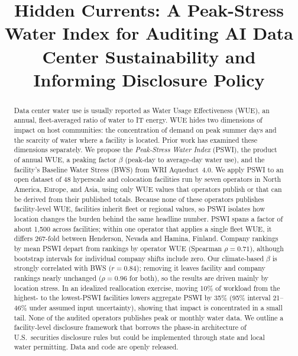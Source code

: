 \documentclass[conference,10pt]{IEEEtran}
\begin{document}
\title{Hidden Currents: A Peak-Stress Water Index for Auditing AI Data Center Sustainability and Informing Disclosure Policy}

\author{
}

\maketitle
\thispagestyle{plain}
\pagestyle{plain}

\begin{abstract}
Data center water use is usually reported as Water Usage Effectiveness (WUE),
an annual, fleet-averaged ratio of water to IT energy. WUE hides two
dimensions of impact on host communities: the concentration of demand on peak
summer days and the scarcity of water where a facility is located. Prior work
has examined these dimensions separately. We propose the \emph{Peak-Stress
Water Index} (PSWI), the product of annual WUE, a peaking factor $\beta$
(peak-day to average-day water use), and the facility's Baseline Water Stress
(BWS) from WRI Aqueduct~4.0. We apply PSWI to an open dataset of 48
hyperscale and colocation facilities run by seven operators in North America,
Europe, and Asia, using only WUE values that operators publish or that can be
derived from their published totals. Because none of these operators
publishes facility-level WUE, facilities inherit fleet or regional values, so
PSWI isolates how location changes the burden behind the same headline
number. PSWI spans a factor of about 1{,}500 across facilities; within one
operator that applies a single fleet WUE, it differs 267-fold between
Henderson, Nevada and Hamina, Finland. Company rankings by mean PSWI depart
from rankings by operator WUE (Spearman $\rho = 0.71$), although bootstrap
intervals for individual company shifts include zero. Our climate-based
$\beta$ is strongly correlated with BWS ($r = 0.84$); removing it leaves
facility and company rankings nearly unchanged ($\rho = 0.96$ for both), so
the results are driven mainly by location stress. In an idealized
reallocation exercise, moving 10\% of workload from the highest- to the
lowest-PSWI facilities lowers aggregate PSWI by 35\% (95\% interval
21--46\% under assumed input uncertainty), showing that impact is
concentrated in a small tail. None of the audited operators publishes peak or
monthly water data. We outline a facility-level disclosure framework that
borrows the phase-in architecture of U.S.\ securities disclosure rules but
could be implemented through state and local water permitting. Data and code
are openly released.
\end{abstract}
\end{document}
